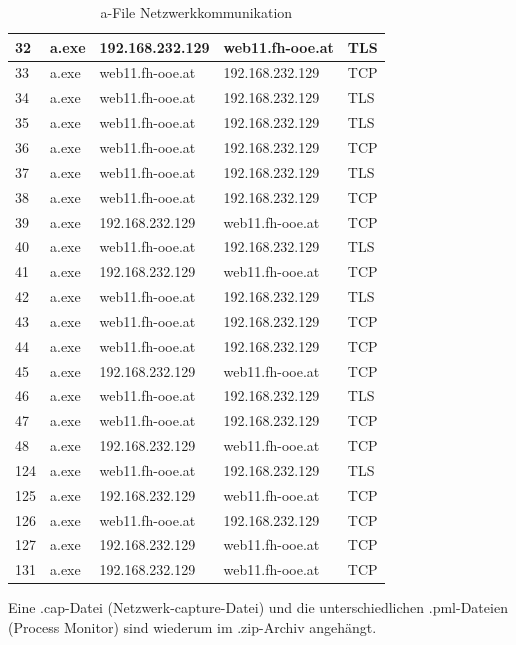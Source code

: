 \documentclass{article}
\begin{document}
\begin{table}[h]
\begin{tabular}{|m{1cm}|m{1.5cm}|m{3cm}|m{3cm}|m{1.4cm}|}
			32 &        a.exe & 192.168.232.129 & web11.fh-ooe.at &           TLS \\ \hline
			33 &        a.exe & web11.fh-ooe.at & 192.168.232.129 &           TCP \\ \hline
			34 &        a.exe & web11.fh-ooe.at & 192.168.232.129 &           TLS \\ \hline
			35 &        a.exe & web11.fh-ooe.at & 192.168.232.129 &           TLS \\ \hline
			36 &        a.exe & web11.fh-ooe.at & 192.168.232.129 &           TCP \\ \hline
			37 &        a.exe & web11.fh-ooe.at & 192.168.232.129 &           TLS \\ \hline
			38 &        a.exe & web11.fh-ooe.at & 192.168.232.129 &           TCP \\ \hline
			39 &        a.exe & 192.168.232.129 & web11.fh-ooe.at &           TCP \\ \hline
			40 &        a.exe & web11.fh-ooe.at & 192.168.232.129 &           TLS \\ \hline
			41 &        a.exe & 192.168.232.129 & web11.fh-ooe.at &           TCP \\ \hline
			42 &        a.exe & web11.fh-ooe.at & 192.168.232.129 &           TLS \\ \hline
			43 &        a.exe & web11.fh-ooe.at & 192.168.232.129 &           TCP \\ \hline
			44 &        a.exe & web11.fh-ooe.at & 192.168.232.129 &           TCP \\ \hline
			45 &        a.exe & 192.168.232.129 & web11.fh-ooe.at &           TCP \\ \hline
			46 &        a.exe & web11.fh-ooe.at & 192.168.232.129 &           TLS \\ \hline
			47 &        a.exe & web11.fh-ooe.at & 192.168.232.129 &           TCP \\ \hline
			48 &        a.exe & 192.168.232.129 & web11.fh-ooe.at &           TCP \\ \hline
			124 &        a.exe & web11.fh-ooe.at & 192.168.232.129 &           TLS \\ \hline
			125 &        a.exe & 192.168.232.129 & web11.fh-ooe.at &           TCP \\ \hline
			126 &        a.exe & web11.fh-ooe.at & 192.168.232.129 &           TCP \\ \hline
			127 &        a.exe & 192.168.232.129 & web11.fh-ooe.at &           TCP \\ \hline
			131 &        a.exe & 192.168.232.129 & web11.fh-ooe.at &           TCP \\ \hline
		\end{tabular}
		\caption{a-File Netzwerkkommunikation}
		\label{table:a-network}
	\end{table}
	
	\begin{mynote}
		Eine .cap-Datei (Netzwerk-capture-Datei) und die unterschiedlichen .pml-Dateien (Process Monitor) sind wiederum im .zip-Archiv angehängt.
	\end{mynote}
	
	
	\label{LastPage}
	
\end{document}

